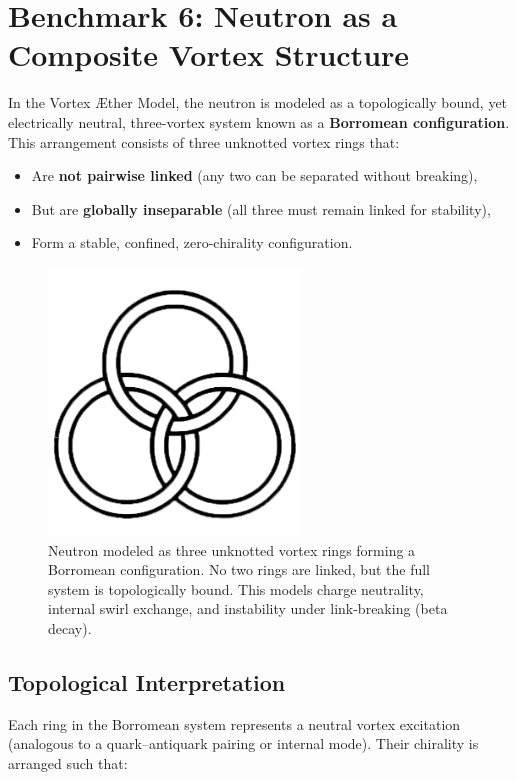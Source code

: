 \section{Benchmark 6: Neutron as a Composite Vortex Structure}

In the Vortex Æther Model, the neutron is modeled as a topologically bound, yet electrically neutral, three-vortex system known as a \textbf{Borromean configuration}. This arrangement consists of three unknotted vortex rings that:

\begin{itemize}
    \item Are \textbf{not pairwise linked} (any two can be separated without breaking),
    \item But are \textbf{globally inseparable} (all three must remain linked for stability),
    \item Form a stable, confined, zero-chirality configuration.
\end{itemize}

\begin{figure}[H]
    \centering
    \includegraphics[width=0.6\textwidth]{images/borromean}
    \caption{Neutron modeled as three unknotted vortex rings forming a Borromean configuration. No two rings are linked, but the full system is topologically bound. This models charge neutrality, internal swirl exchange, and instability under link-breaking (beta decay).}
\end{figure}

\subsection{Topological Interpretation}

Each ring in the Borromean system represents a neutral vortex excitation (analogous to a quark–antiquark pairing or internal mode). Their chirality is arranged such that:

